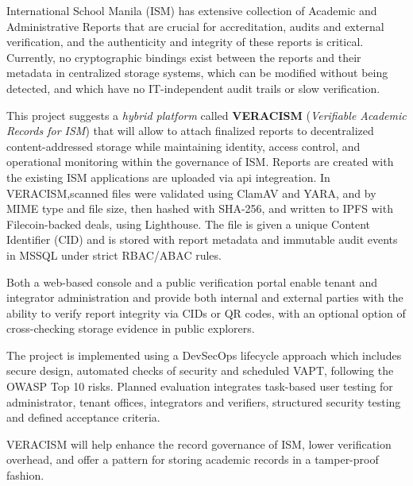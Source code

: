 
\begin{abstractwithpageno}	
International School Manila (ISM) has extensive collection of Academic and Administrative Reports that are crucial for accreditation, audits and external verification, and the authenticity and integrity of these reports is critical. Currently, no cryptographic bindings exist between the reports and their metadata in centralized storage systems, which can be modified without being detected, and which have no IT-independent audit trails or slow verification. 

This project suggests a \textit{hybrid platform} called \textbf{VERACISM} (\textit{Verifiable Academic Records for ISM}) that will allow to attach finalized reports to decentralized content-addressed storage while maintaining identity, access control, and operational monitoring within the governance of ISM. Reports are created with the existing ISM applications are uploaded via api integreation. In VERACISM,scanned files were validated using ClamAV and YARA, and by MIME type and file size, then hashed with SHA-256, and written to IPFS with Filecoin-backed deals, using Lighthouse. The file is given a unique Content Identifier (CID) and is stored with report metadata and immutable audit events in MSSQL under strict RBAC/ABAC rules. 

Both a web-based console and a public verification portal enable tenant and integrator administration and provide both internal and external parties with the ability to verify report integrity via CIDs or QR codes, with an optional option of cross-checking storage evidence in public explorers. 

The project is implemented using a DevSecOps lifecycle approach which includes secure design, automated checks of security and scheduled VAPT, following the OWASP Top 10 risks. Planned evaluation integrates task-based user testing for administrator, tenant offices, integrators and verifiers, structured security testing and defined acceptance criteria. 

VERACISM will help enhance the record governance of ISM, lower verification overhead, and offer a pattern for storing academic records in a tamper-proof fashion.
\end{abstractwithpageno}
